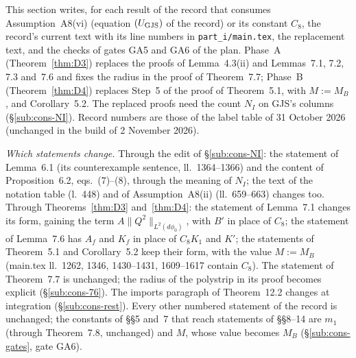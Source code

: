 
This section writes, for each result of the record that consumes Assumption~A8(vi) (equation
$(U_{\rm GJS})$ of the record) or its constant $C_8$, the record's current text with its line numbers in
\texttt{part\_i/main.tex}, the replacement text, and the checks of gates GA5 and GA6 of the plan.
Phase~A (Theorem~\ref{thm:D3}) replaces the proofs of Lemma~4.3(ii) and Lemmas~7.1, 7.2, 7.3
and~7.6 and fixes the radius in the proof of Theorem~7.7; Phase~B (Theorem~\ref{thm:D4}) replaces
Step~5 of the proof of Theorem~5.1, with $M:=M_B$, and Corollary~5.2.  The replaced proofs need
the count $N_I$ on GJS's columns (\S\ref{sub:cons-NI}).  Record numbers are those of the label
table of 31 October 2026 (unchanged in the build of 2 November 2026).

\emph{Which statements change.}  Through the edit of \S\ref{sub:cons-NI}: the statement of
Lemma~6.1 (its counterexample sentence, ll.~1364--1366) and the content of Proposition~6.2,
eqs.~(7)--(8), through the meaning of $N_I$; the text of the notation table (l.~448) and of
Assumption~A8(ii) (ll.~659--663) changes too.  Through Theorems~\ref{thm:D3} and~\ref{thm:D4}:
the statement of Lemma~7.1 changes its form, gaining the term $A\|Q^2\|_{L^2(d\phi_0)}$, with
$B'$ in place of $C_8$; the statement of Lemma~7.6 has $A_f$ and $K_f$ in place of $C_8K_1$ and
$K'$; the statements of Theorem~5.1 and Corollary~5.2 keep their form, with the value
$M:=M_B$ (main.tex ll.~1262, 1346, 1430--1431, 1609--1617 contain $C_8$).  The statement of
Theorem~7.7 is unchanged; the radius of the polystrip in its proof becomes explicit
(\S\ref{sub:cons-76}).  The imports paragraph of Theorem~12.2 changes at integration
(\S\ref{sub:cons-rest}).  Every other numbered statement of the record is unchanged; the
constants of \S\S5 and~7 that reach statements of \S\S8--14 are $m_1$ (through Theorem~7.8,
unchanged) and $M$, whose value becomes $M_B$ (\S\ref{sub:cons-gates}, gate GA6).

